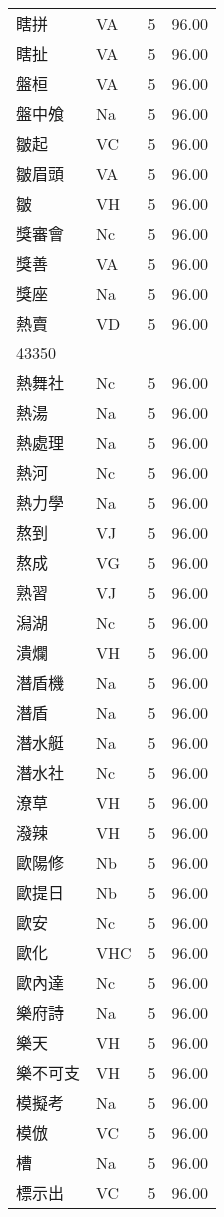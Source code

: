 \documentclass[twocolumn]{book}
\begin{document}
\begin{supertabular}{llrr}
瞎拼 & VA & 5 &  96.00\\
瞎扯 & VA & 5 &  96.00\\
盤桓 & VA & 5 &  96.00\\
盤中飧 & Na & 5 &  96.00\\
皺起 & VC & 5 &  96.00\\
皺眉頭 & VA & 5 &  96.00\\
皺 & VH & 5 &  96.00\\
獎審會 & Nc & 5 &  96.00\\
獎善 & VA & 5 &  96.00\\
獎座 & Na & 5 &  96.00\\
熱賣 & VD & 5 &  96.00\\
43350\\
熱舞社 & Nc & 5 &  96.00\\
熱湯 & Na & 5 &  96.00\\
熱處理 & Na & 5 &  96.00\\
熱河 & Nc & 5 &  96.00\\
熱力學 & Na & 5 &  96.00\\
熬到 & VJ & 5 &  96.00\\
熬成 & VG & 5 &  96.00\\
熟習 & VJ & 5 &  96.00\\
潟湖 & Nc & 5 &  96.00\\
潰爛 & VH & 5 &  96.00\\
潛盾機 & Na & 5 &  96.00\\
潛盾 & Na & 5 &  96.00\\
潛水艇 & Na & 5 &  96.00\\
潛水社 & Nc & 5 &  96.00\\
潦草 & VH & 5 &  96.00\\
潑辣 & VH & 5 &  96.00\\
歐陽修 & Nb & 5 &  96.00\\
歐提日 & Nb & 5 &  96.00\\
歐安 & Nc & 5 &  96.00\\
歐化 & VHC & 5 &  96.00\\
歐內達 & Nc & 5 &  96.00\\
樂府詩 & Na & 5 &  96.00\\
樂天 & VH & 5 &  96.00\\
樂不可支 & VH & 5 &  96.00\\
模擬考 & Na & 5 &  96.00\\
模倣 & VC & 5 &  96.00\\
槽 & Na & 5 &  96.00\\
標示出 & VC & 5 &  96.00\\

\end{supertabular}
\end{document}
